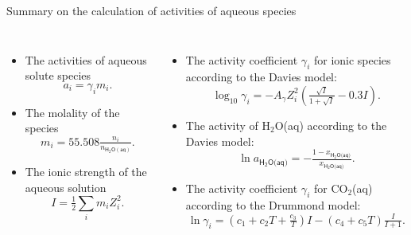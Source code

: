 \begin{frame}[shrink=10]{Summary on the calculation of activities of aqueous species}
	\begin{columns}[t]
		\vskip 20pt
		\begin{itemize}[<+->]
			\item  The \alert{activities} of aqueous solute species 
			\[
			a_{i}=\gamma_{i}m_{i}.
			\]
			\item The \alert{molality} of the species 
			\[
			m_{i}=55.508\tfrac{n_{i}}{n_{\mathsf{H_{2}O(aq)}}}.
			\]
			\item The \alert{ionic strength} of the aqueous solution 
			\[
			I=\tfrac{1}{2}\sum_{i}m_{i}Z_{i}^{2}.
			\]
		\end{itemize}
		
		\begin{itemize}[<+->]
			\item  The \alert{activity coefficient} $\gamma_{i}$  for  \alert{ionic species} according to the Davies model:
			\[
			\log_{10}\gamma_{i}=-A_{\gamma}Z_{i}^{2}\left(\tfrac{\sqrt{I}}{1+\sqrt{I}}-0.3I\right).
			\]
			\item The \alert{activity of H$_{2}$O(aq)} according to the Davies model:
			\[
			\ln a_{\mathsf{H_{2}O\text{(aq)}}}=-\tfrac{1-x_{\mathsf{\mathsf{H_{2}O\text{(aq)}}}}}{x_{\mathsf{\mathsf{H_{2}O\text{(aq)}}}}}.
			\]
			\item The \alert{activity coefficient} $\gamma_{i}$ for  \alert{CO$_{2}$(aq)} according to the Drummond model:
			\[
			\ln\gamma_{i}=\left(c_{1}+c_{2}T+\tfrac{c_{3}}{T}\right)I-(c_{4}+c_{5}T)\tfrac{I}{I+1}.
			\]
			
		\end{itemize}
	\end{columns}
	
\end{frame}
%
%
